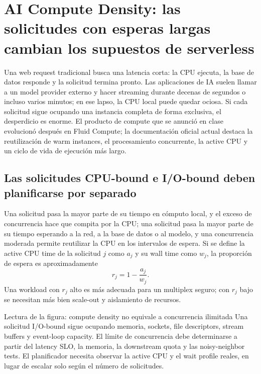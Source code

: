 \section{AI Compute Density: las solicitudes con esperas largas cambian los supuestos de serverless}

Una web request tradicional busca una latencia corta: la CPU ejecuta, la base de datos responde y la solicitud termina pronto. Las aplicaciones de IA suelen llamar a un model provider externo y hacer streaming durante decenas de segundos o incluso varios minutos; en ese lapso, la CPU local puede quedar ociosa. Si cada solicitud sigue ocupando una instancia completa de forma exclusiva, el desperdicio es enorme. El producto de compute que se anunció en clase evolucionó después en Fluid Compute; la documentación oficial actual destaca la reutilización de warm instances, el procesamiento concurrente, la active CPU y un ciclo de vida de ejecución más largo.

\subsection{Las solicitudes CPU-bound e I/O-bound deben planificarse por separado}

Una solicitud  pasa la mayor parte de su tiempo en cómputo local, y el exceso de concurrencia hace que compita por la CPU; una solicitud  pasa la mayor parte de su tiempo esperando a la red, a la base de datos o al modelo, y una concurrencia moderada permite reutilizar la CPU en los intervalos de espera. Si se define la active CPU time de la solicitud $j$ como $a_j$ y su wall time como $w_j$, la proporción de espera es aproximadamente
\[
r_j=1-\frac{a_j}{w_j}.
\]
Una workload con $r_j$ alto es más adecuada para un multiplex seguro; con $r_j$ bajo se necesitan más bien scale-out y aislamiento de recursos.


\begin{knowledgebox}{Lectura de la figura: compute density no equivale a concurrencia ilimitada}
Una solicitud I/O-bound sigue ocupando memoria, sockets, file descriptors, stream buffers y event-loop capacity. El límite de concurrencia debe determinarse a partir del latency SLO, la memoria, la downstream quota y las noisy-neighbor tests. El planificador necesita observar la active CPU y el wait profile reales, en lugar de escalar solo según el número de solicitudes.
\end{knowledgebox}

